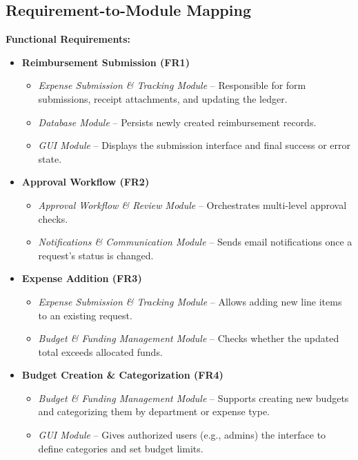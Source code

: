 \documentclass[12pt, titlepage]{article}
\begin{document}
\subsection{Requirement-to-Module Mapping}

\textbf{Functional Requirements:}
\begin{itemize}
  \item \textbf{Reimbursement Submission (FR1)} 
    \begin{itemize}
      \item \emph{Expense Submission \& Tracking Module} – Responsible for form submissions, receipt attachments, and updating the ledger.
      \item \emph{Database Module} – Persists newly created reimbursement records.
      \item \emph{GUI Module} – Displays the submission interface and final success or error state.
    \end{itemize}

  \item \textbf{Approval Workflow (FR2)}
    \begin{itemize}
      \item \emph{Approval Workflow \& Review Module} – Orchestrates multi-level approval checks.
      \item \emph{Notifications \& Communication Module} – Sends email notifications once a request’s status is changed.
    \end{itemize}

  \item \textbf{Expense Addition (FR3)}
    \begin{itemize}
      \item \emph{Expense Submission \& Tracking Module} – Allows adding new line items to an existing request.
      \item \emph{Budget \& Funding Management Module} – Checks whether the updated total exceeds allocated funds.
    \end{itemize}

  \item \textbf{Budget Creation \& Categorization (FR4)}
    \begin{itemize}
      \item \emph{Budget \& Funding Management Module} – Supports creating new budgets and categorizing them by department or expense type.
      \item \emph{GUI Module} – Gives authorized users (e.g., admins) the interface to define categories and set budget limits.
    \end{itemize}


\end{itemize}
\end{document}
